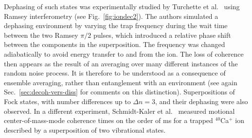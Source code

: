 \documentclass[3p,sort&compress]{elsarticle}
\begin{document}
Dephasing of such states was experimentally studied by Turchette et al.\ \cite{Turchette:2000:aa} using Ramsey interferometry  (see Fig.~\ref{fig:iondec2}). The authors simulated a dephasing environment by varying the trap frequency during the wait time between the two Ramsey $\pi/2$ pulses, which introduced a relative phase shift between the components in the superposition. The frequency was changed adiabatically to avoid energy transfer to and from the ion. The loss of coherence then appears as the result of an averaging over many different instances of the random noise process. It is therefore to be understood as a consequence of ensemble averaging, rather than entanglement with an environment (see again Sec.~\ref{sec:decoh-vers-diss} for comments on this distinction). Superpositions of Fock states, with number differences up to $\Delta n = 3$, and their dephasing were also observed. In a different experiment, Schmidt-Kaler et al.\ \cite{SchmidtKaler:2003:pp} measured motional center-of-mass-mode coherence times on the order of \unit[100]{ms} for a trapped $^{40}$Ca$^+$ ion described by a superposition of two vibrational states.
\end{document}
